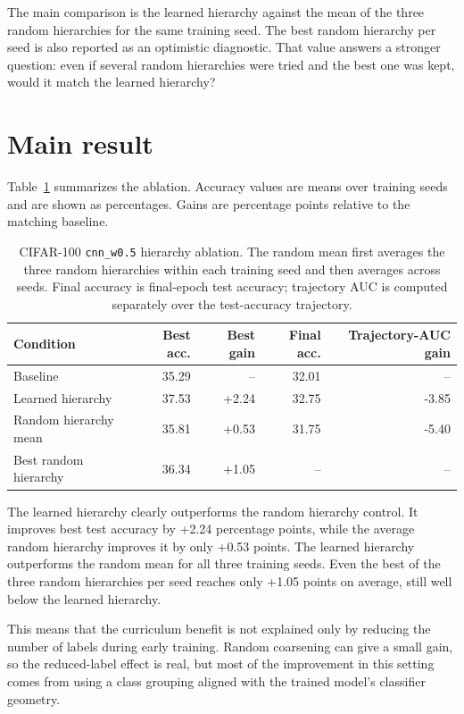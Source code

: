 The main comparison is the learned hierarchy against the mean of the three
random hierarchies for the same training seed. The best random hierarchy per
seed is also reported as an optimistic diagnostic. That value answers a stronger
question: even if several random hierarchies were tried and the best one was
kept, would it match the learned hierarchy?

\section{Main result}

Table~\ref{tab:hier-ablation-aggregate} summarizes the ablation. Accuracy values
are means over training seeds and are shown as percentages. Gains are percentage
points relative to the matching baseline.

\begin{table}[h]
\centering
\small
\begin{tabular}{lrrrr}
\hline
Condition & Best acc. & Best gain & Final acc. & Trajectory-AUC gain \\
\hline
Baseline & 35.29 & -- & 32.01 & -- \\
Learned hierarchy & 37.53 & +2.24 & 32.75 & -3.85 \\
Random hierarchy mean & 35.81 & +0.53 & 31.75 & -5.40 \\
Best random hierarchy & 36.34 & +1.05 & -- & -- \\
\hline
\end{tabular}
\caption{CIFAR-100 \texttt{cnn\_w0.5} hierarchy ablation. The random mean first
averages the three random hierarchies within each training seed and then
averages across seeds. Final accuracy is final-epoch test accuracy; trajectory
AUC is computed separately over the test-accuracy trajectory.}
\label{tab:hier-ablation-aggregate}
\end{table}

The learned hierarchy clearly outperforms the random hierarchy control. It
improves best test accuracy by +2.24 percentage points, while the average random
hierarchy improves it by only +0.53 points. The learned hierarchy outperforms
the random mean for all three training seeds. Even the best of the three random
hierarchies per seed reaches only +1.05 points on average, still well below the
learned hierarchy.

This means that the curriculum benefit is not explained only by reducing the
number of labels during early training. Random coarsening can give a small gain,
so the reduced-label effect is real, but most of the improvement in this setting
comes from using a class grouping aligned with the trained model's classifier
geometry.

